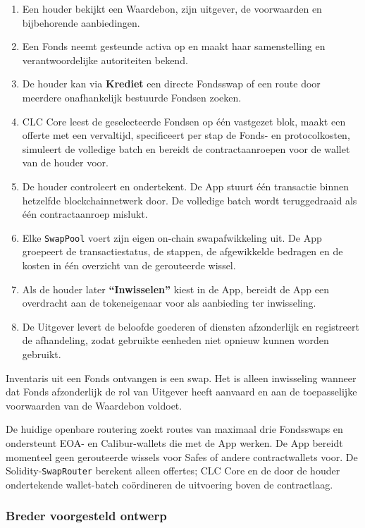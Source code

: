 \documentclass[11pt]{article}
\begin{document}
\begin{enumerate}[leftmargin=*]
\item Een houder bekijkt een Waardebon, zijn uitgever, de voorwaarden en bijbehorende aanbiedingen.
\item Een Fonds neemt gesteunde activa op en maakt haar samenstelling en verantwoordelijke autoriteiten bekend.
\item De houder kan via \textbf{Krediet} een directe Fondsswap of een route door meerdere onafhankelijk bestuurde Fondsen zoeken.
\item CLC Core leest de geselecteerde Fondsen op één vastgezet blok, maakt een offerte met een vervaltijd, specificeert per stap de Fonds- en protocolkosten, simuleert de volledige batch en bereidt de contractaanroepen voor de wallet van de houder voor.
\item De houder controleert en ondertekent. De App stuurt één transactie binnen hetzelfde blockchainnetwerk door. De volledige batch wordt teruggedraaid als één contractaanroep mislukt.
\item Elke \texttt{SwapPool} voert zijn eigen on-chain swapafwikkeling uit. De App groepeert de transactiestatus, de stappen, de afgewikkelde bedragen en de kosten in één overzicht van de gerouteerde wissel.
\item Als de houder later \textbf{``Inwisselen''} kiest in de App, bereidt de App een overdracht aan de tokeneigenaar voor als aanbieding ter inwisseling.
\item De Uitgever levert de beloofde goederen of diensten afzonderlijk en registreert de afhandeling, zodat gebruikte eenheden niet opnieuw kunnen worden gebruikt.
\end{enumerate}
Inventaris uit een Fonds ontvangen is een swap. Het is alleen inwisseling wanneer dat Fonds afzonderlijk de rol van Uitgever heeft aanvaard en aan de toepasselijke voorwaarden van de Waardebon voldoet.

De huidige openbare routering zoekt routes van maximaal drie Fondsswaps en ondersteunt EOA- en Calibur-wallets die met de App werken. De App bereidt momenteel geen gerouteerde wissels voor Safes of andere contractwallets voor. De Solidity-\texttt{SwapRouter} berekent alleen offertes; CLC Core en de door de houder ondertekende wallet-batch coördineren de uitvoering boven de contractlaag.

\subsubsection*{Breder voorgesteld ontwerp}
\end{document}
